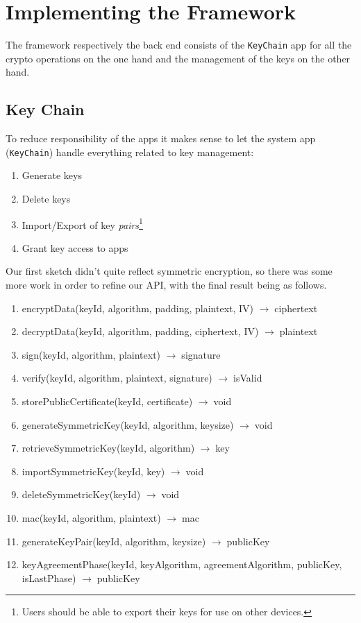 \documentclass[a4paper,bibtotoc,draft]{scrartcl}
\newcommand{\totype}{\(\to\;\)}
\begin{document}
\section{Implementing the Framework}

	The framework respectively the back end consists of the \texttt{KeyChain} app for all the crypto operations on the one hand and the management of the keys on the other hand.

	\subsection{Key Chain}
		To reduce responsibility of the apps it makes sense to let the system app (\texttt{KeyChain}) handle everything related to key management:
		\begin{enumerate}
			\item Generate keys
			\item Delete keys
			\item Import/Export of key \emph{pairs}\footnote{Users should be able to export their keys for use on other devices.}
			\item Grant key access to apps
		\end{enumerate}
		Our first sketch didn't quite reflect symmetric encryption, so there was some more work in order to refine our API, with the final result being as follows.

		\begin{enumerate}
		\tt
			\item encryptData(keyId, algorithm, padding, plaintext, IV) \totype ciphertext
			\item decryptData(keyId, algorithm, padding, ciphertext, IV) \totype plaintext
			\item sign(keyId, algorithm, plaintext) \totype signature
			\item verify(keyId, algorithm, plaintext, signature) \totype isValid
			\item storePublicCertificate(keyId, certificate) \totype void

			\item generateSymmetricKey(keyId, algorithm, keysize) \totype void
			\item retrieveSymmetricKey(keyId, algorithm) \totype key
			\item importSymmetricKey(keyId, key) \totype void
			\item deleteSymmetricKey(keyId) \totype void
			\item mac(keyId, algorithm, plaintext) \totype mac

			\item generateKeyPair(keyId, algorithm, keysize) \totype publicKey
			\item keyAgreementPhase(keyId, keyAlgorithm, agreementAlgorithm,
				\linebreak %
				publicKey, isLastPhase) \totype publicKey
		\end{enumerate}
\end{document}
